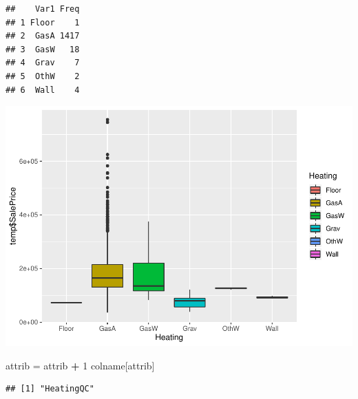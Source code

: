 \documentclass[]{article}
\newenvironment{Shaded}{\begin{snugshade}}{\end{snugshade}}
\newcommand{\DecValTok}[1]{\textcolor[rgb]{0.00,0.00,0.81}{#1}}
\newcommand{\StringTok}[1]{\textcolor[rgb]{0.31,0.60,0.02}{#1}}
\newcommand{\OperatorTok}[1]{\textcolor[rgb]{0.81,0.36,0.00}{\textbf{#1}}}
\newcommand{\NormalTok}[1]{#1}
\begin{document}
\begin{verbatim}
##    Var1 Freq
## 1 Floor    1
## 2  GasA 1417
## 3  GasW   18
## 4  Grav    7
## 5  OthW    2
## 6  Wall    4
\end{verbatim}

\includegraphics{EDA_files/figure-latex/unnamed-chunk-62-1.pdf}

\begin{Shaded}
\begin{Highlighting}[]
\NormalTok{attrib =}\StringTok{ }\NormalTok{attrib }\OperatorTok{+}\StringTok{ }\DecValTok{1}
\NormalTok{colname[attrib]}
\end{Highlighting}
\end{Shaded}

\begin{verbatim}
## [1] "HeatingQC"
\end{verbatim}
\end{document}
